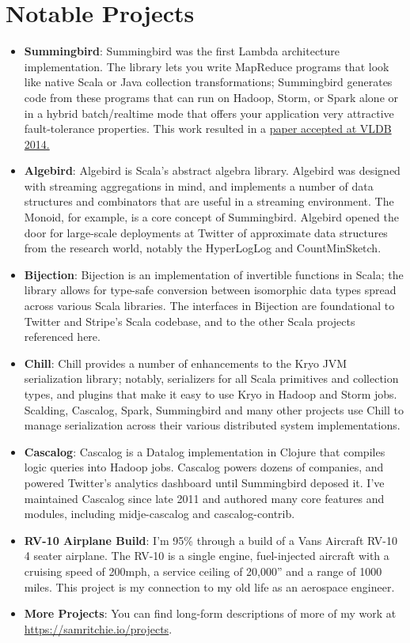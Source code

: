 \documentclass[letterpaper,11pt]{article}
\newcommand{\resumeItem}[2]{\item\small{
    \textbf{#1}{: #2 \vspace{-2pt}}
  }
}
\newcommand{\resumeSubItem}[2]{\resumeItem{#1}{#2}\vspace{-4pt}}
\newcommand{\resumeSubHeadingListStart}{\begin{itemize}[leftmargin=*]}
\newcommand{\resumeSubHeadingListEnd}{\end{itemize}}
\begin{document}
\section{Notable Projects}
\resumeSubHeadingListStart
\resumeSubItem{Summingbird}{
  Summingbird was the first Lambda architecture implementation. The library lets you write MapReduce programs that look like native Scala or Java collection transformations; Summingbird generates code from these programs that can run on Hadoop, Storm, or Spark alone or in a hybrid batch/realtime mode that offers your application very attractive fault-tolerance properties. This work resulted in a \href{http://www.vldb.org/pvldb/vol7/p1441-boykin.pdf}{paper accepted at VLDB 2014.}}
\resumeSubItem{Algebird}{
  Algebird is Scala's abstract algebra library. Algebird was designed with streaming aggregations in mind, and implements a number of data structures and combinators that are useful in a streaming environment. The Monoid, for example, is a core concept of Summingbird. Algebird opened the door for large-scale deployments at Twitter of approximate data structures from the research world, notably the HyperLogLog and CountMinSketch.}
\resumeSubItem{Bijection}{
  Bijection is an implementation of invertible functions in Scala; the library allows for type-safe conversion between isomorphic data types spread across various Scala libraries. The interfaces in Bijection are foundational to Twitter and Stripe's Scala codebase, and to the other Scala projects referenced here.}
\resumeSubItem{Chill}{
  Chill provides a number of enhancements to the Kryo JVM serialization library; notably, serializers for all Scala primitives and collection types, and plugins that make it easy to use Kryo in Hadoop and Storm jobs. Scalding, Cascalog, Spark, Summingbird and many other projects use Chill to manage serialization across their various distributed system implementations.}
\resumeSubItem{Cascalog}{
Cascalog is a Datalog implementation in Clojure that compiles logic queries into Hadoop jobs. Cascalog powers dozens of companies, and powered Twitter's analytics dashboard until Summingbird deposed it. I've maintained Cascalog since late 2011 and authored many core features and modules, including midje-cascalog and cascalog-contrib.}

\resumeSubItem{RV-10 Airplane Build}{
  I'm 95\% through a build of a Vans Aircraft RV-10 4 seater airplane. The RV-10 is a single engine, fuel-injected aircraft with a cruising speed of 200mph, a service ceiling of 20,000'' and a range of 1000 miles. This project is my connection to my old life as an aerospace engineer.}
\resumeSubItem{More Projects}{
  You can find long-form descriptions of more of my work at \href{https://samritchie.io/projects/}{https://samritchie.io/projects}.
}
\resumeSubHeadingListEnd
\end{document}
